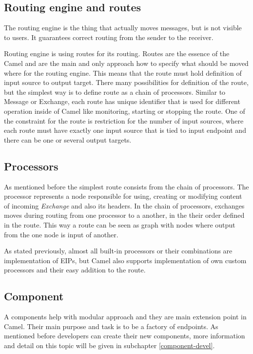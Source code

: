 \documentclass[12pt,final,oneside]{fithesis2}
\begin{document}
\subsection*{Routing engine and routes}
The routing engine is the thing that actually moves messages, but is not visible to users. It guarantees correct routing from the sender to the receiver.

Routing engine is using routes for its routing. Routes are the essence of the Camel and are the main and only approach how to specify what should be moved where for the routing engine. This means that the route must hold definition of input source to output target. There many possibilities for definition of the route, but the simplest way is to define route as a chain of processors\cite{camel-in-action}. Similar to Message or Exchange, each route has unique identifier that is used for different operation inside of Camel like monitoring, starting or stopping the route. One of the constraint for the route is restriction for the number of input sources, where each route must have exactly one input source that is tied to input endpoint and there can be one or several output targets.

\subsection*{Processors}
As mentioned before the simplest route consists from the chain of processors. The processor represents a node responsible for using, creating or modifying content of incoming \textit{Exchange} and also its headers. In the chain of processors, exchanges moves during routing from one processor to a another, in the their order defined in the route. This way a route can be seen as graph with nodes where output from the one node is input of another.

As stated previously, almost all built-in processors or their combinations are implementation of EIPs, but Camel also supports implementation of own custom processors and their easy addition to the route.

\subsection*{Component}
A components help with modular approach and they are main extension point in Camel. Their main purpose and task is to be a factory of endpoints. As mentioned before developers can create their new components, more information and detail on this topic will be given in subchapter \ref{component-devel}. 
\end{document}
